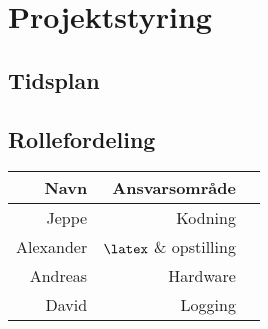\section{Projektstyring}
    \begin{landscape}
        \subsection{Tidsplan}
            
    \end{landscape}
    \subsection{Rollefordeling}
        \begin{tabular}{r|r|r}
            Navn & Ansvarsområde &  \\ \hline
            Jeppe &  Kodning \\ \hline
            Alexander  & $\mathrm{\latex}$ \& opstilling \\ \hline
            Andreas & Hardware   \\ \hline
            David &  Logging \\ \hline
        \end{tabular}